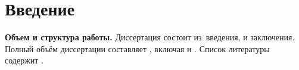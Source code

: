 \chapter*{Введение}             %

\newcommand{\actuality}{{\textbf\actualityTXT}}
\newcommand{\progress}{}
\newcommand{\aim}{{\textbf\aimTXT}}
\newcommand{\tasks}{\textbf{\tasksTXT}}
\newcommand{\novelty}{\textbf{\noveltyTXT}}
\newcommand{\influence}{\textbf{\influenceTXT}} 
\newcommand{\methods}{\textbf{\methodsTXT}}
\newcommand{\defpositions}{\textbf{\defpositionsTXT}}
\newcommand{\reliability}{\textbf{\reliabilityTXT}}
\newcommand{\probation}{\textbf{\probationTXT}}
\newcommand{\sootvetstvie}{\textbf{\sootvetstvieTXT}}
\newcommand{\contribution}{\textbf{\contributionTXT}}
\newcommand{\publications}{\textbf{\publicationsTXT}}


\textbf{Объем и структура работы.} Диссертация состоит из~введения,
 и заключения.
%
Полный объём диссертации составляет
, включая
и .
Список литературы содержит
.
